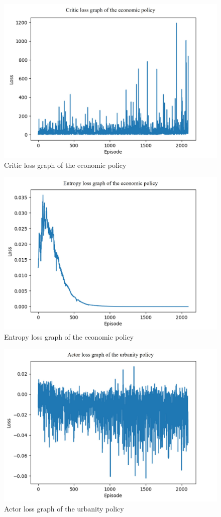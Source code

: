 \documentclass[preprint,12pt]{elsarticle}
\begin{document}
\begin{figure}[h!]
    \centering
    \includegraphics[width=0.7\linewidth]{paper/doc/result_figure/AFMORL_eco_cri_loss_v1.jpg}
    \caption{Critic loss graph of the economic policy}
    
    \label{fig:enter-label}
\end{figure}

\begin{figure}[h!]
    \centering
    \includegraphics[width=0.7\linewidth]{paper/doc/result_figure/AFMORL_eco_entr_loss_v1.jpg}
    \caption{Entropy loss graph of the economic policy}
    
    \label{fig:enter-label}
\end{figure}

\begin{figure}[h!]
    \centering
    \includegraphics[width=0.7\linewidth]{paper/doc/result_figure/AFMORL_urb_act_loss_v1.jpg}
    \caption{Actor loss graph of the urbanity policy}
    
    \label{fig:enter-label}
\end{figure}
\end{document}
